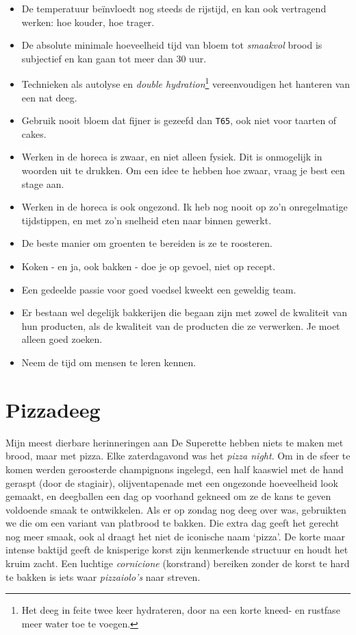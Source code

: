 \documentclass[
  11pt,
  dutch,
]{memoir}
\providecommand{\tightlist}{%
  \setlength{\itemsep}{0pt}\setlength{\parskip}{0pt}}
\begin{document}
\begin{itemize}
\tightlist
\item
  De temperatuur beïnvloedt nog steeds de rijstijd, en kan ook
  vertragend werken: hoe kouder, hoe trager.
\item
  De absolute minimale hoeveelheid tijd van bloem tot \emph{smaakvol}
  brood is subjectief en kan gaan tot meer dan 30 uur.
\item
  Technieken als autolyse en \emph{double hydration}\footnote{Het deeg
    in feite twee keer hydrateren, door na een korte kneed- en rustfase
    meer water toe te voegen.} vereenvoudigen het hanteren van een nat
  deeg.
\item
  Gebruik nooit bloem dat fijner is gezeefd dan \texttt{T65}, ook niet
  voor taarten of cakes.
\item
  Werken in de horeca is zwaar, en niet alleen fysiek. Dit is onmogelijk
  in woorden uit te drukken. Om een idee te hebben hoe zwaar, vraag je
  best een stage aan.
\item
  Werken in de horeca is ook ongezond. Ik heb nog nooit op zo'n
  onregelmatige tijdstippen, en met zo'n snelheid eten naar binnen
  gewerkt.
\item
  De beste manier om groenten te bereiden is ze te roosteren.
\item
  Koken - en ja, ook bakken - doe je op gevoel, niet op recept.
\item
  Een gedeelde passie voor goed voedsel kweekt een geweldig team.
\item
  Er bestaan wel degelijk bakkerijen die begaan zijn met zowel de
  kwaliteit van hun producten, als de kwaliteit van de producten die ze
  verwerken. Je moet alleen goed zoeken.
\item
  Neem de tijd om mensen te leren kennen.
\end{itemize}

\hypertarget{pizzadeeg}{%
\section{Pizzadeeg}\label{pizzadeeg}}

Mijn meest dierbare herinneringen aan De Superette hebben niets te maken
met brood, maar met pizza. Elke zaterdagavond was het \emph{pizza
night}. Om in de sfeer te komen werden geroosterde champignons ingelegd,
een half kaaswiel met de hand geraspt (door de stagiair),
olijventapenade met een ongezonde hoeveelheid look gemaakt, en
deegballen een dag op voorhand gekneed om ze de kans te geven voldoende
smaak te ontwikkelen. Als er op zondag nog deeg over was, gebruikten we
die om een variant van platbrood te bakken. Die extra dag geeft het
gerecht nog meer smaak, ook al draagt het niet de iconische naam
`pizza'. De korte maar intense baktijd geeft de knisperige korst zijn
kenmerkende structuur en houdt het kruim zacht. Een luchtige
\emph{cornicione} (korstrand) bereiken zonder de korst te hard te bakken
is iets waar \emph{pizzaiolo's} naar streven.
\end{document}
